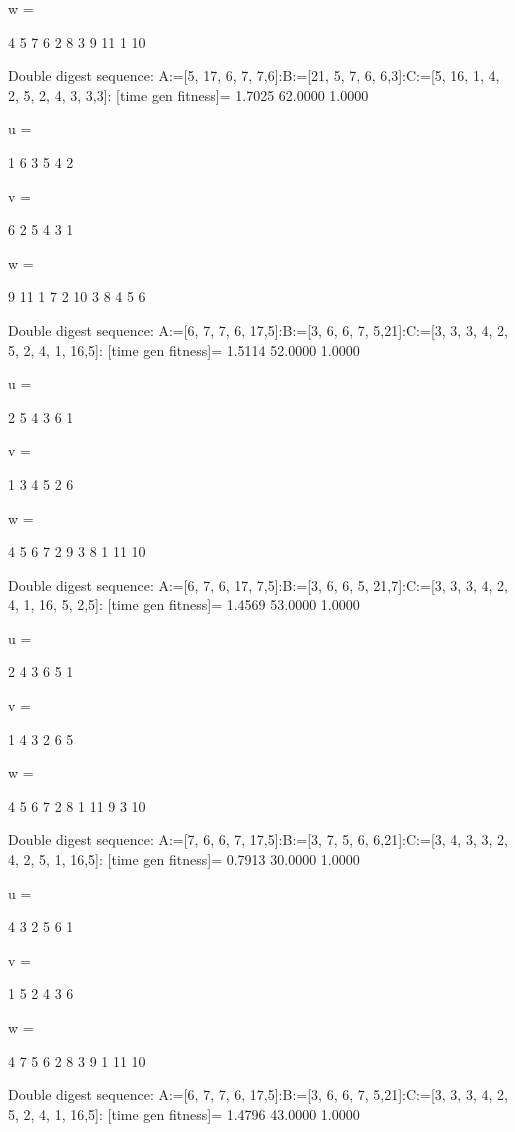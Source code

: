 w =

     4     5     7     6     2     8     3     9    11     1    10

Double digest sequence:
A:=[5, 17, 6, 7, 7,6]:B:=[21, 5, 7, 6, 6,3]:C:=[5, 16, 1, 4, 2, 5, 2, 4, 3, 3,3]:
[time gen fitness]=
    1.7025   62.0000    1.0000


u =

     1     6     3     5     4     2


v =

     6     2     5     4     3     1


w =

     9    11     1     7     2    10     3     8     4     5     6

Double digest sequence:
A:=[6, 7, 7, 6, 17,5]:B:=[3, 6, 6, 7, 5,21]:C:=[3, 3, 3, 4, 2, 5, 2, 4, 1, 16,5]:
[time gen fitness]=
    1.5114   52.0000    1.0000


u =

     2     5     4     3     6     1


v =

     1     3     4     5     2     6


w =

     4     5     6     7     2     9     3     8     1    11    10

Double digest sequence:
A:=[6, 7, 6, 17, 7,5]:B:=[3, 6, 6, 5, 21,7]:C:=[3, 3, 3, 4, 2, 4, 1, 16, 5, 2,5]:
[time gen fitness]=
    1.4569   53.0000    1.0000


u =

     2     4     3     6     5     1


v =

     1     4     3     2     6     5


w =

     4     5     6     7     2     8     1    11     9     3    10

Double digest sequence:
A:=[7, 6, 6, 7, 17,5]:B:=[3, 7, 5, 6, 6,21]:C:=[3, 4, 3, 3, 2, 4, 2, 5, 1, 16,5]:
[time gen fitness]=
    0.7913   30.0000    1.0000


u =

     4     3     2     5     6     1


v =

     1     5     2     4     3     6


w =

     4     7     5     6     2     8     3     9     1    11    10

Double digest sequence:
A:=[6, 7, 7, 6, 17,5]:B:=[3, 6, 6, 7, 5,21]:C:=[3, 3, 3, 4, 2, 5, 2, 4, 1, 16,5]:
[time gen fitness]=
    1.4796   43.0000    1.0000


